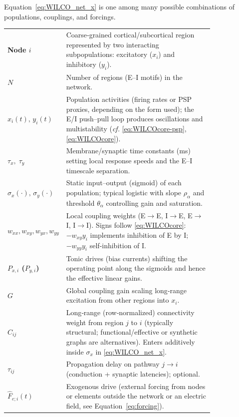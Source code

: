 \documentclass[12pt]{article}
\numberwithin{equation}{section}
\begin{document}
Equation~\ref{eq:WILCO_net_x} is one among many possible combinations of populations, couplings, and forcings.

\begin{tcolorbox}[
  colback=gray!5,
  colframe=slate,
  colbacktitle=softblue!25,
  coltitle=softblue!60!black,
  fonttitle=\bfseries\small,
  title={\small \textit{Wilson-Cowan Network (Eq.~\ref{eq:WILCO_net_x})} \\ Whole-brain Simulations Parameters \& Physiological Meaning},
  boxrule=0.4pt, enhanced, sharp corners,
  left=4pt,right=4pt,top=3pt,bottom=3pt,
  boxsep=2pt, before skip=6pt, after skip=6pt
]
\scriptsize
\begin{tabular}{@{}l p{0.82\linewidth}@{}}
\textbf{Node $i$} & Coarse‑grained cortical/subcortical region represented by two interacting subpopulations: excitatory ($x_i$) and inhibitory ($y_i$).\\
\textbf{$N$} & Number of regions (E–I motifs) in the network.\\
\textbf{$x_i(t),\,y_i(t)$} & Population activities (firing rates or PSP proxies, depending on the form used); the E/I push–pull loop produces oscillations and multistability (\emph{cf.} \eqref{eq:WILCOcore-psp}, \eqref{eq:WILCOcore}).\\
\textbf{$\tau_x,\;\tau_y$} & Membrane/synaptic time constants (ms) setting local response speeds and the E–I timescale separation.\\
\textbf{$\sigma_x(\cdot),\,\sigma_y(\cdot)$} & Static input–output (sigmoid) of each population; typical logistic with slope $\rho_{\alpha}$ and threshold $\theta_{\alpha}$ controlling gain and saturation.\\
\textbf{$w_{xx},w_{xy},w_{yx},w_{yy}$} & Local coupling weights (E$\to$E, I$\to$E, E$\to$I, I$\to$I). Signs follow \eqref{eq:WILCOcore}: $-w_{xy}y_i$ implements inhibition of E by I; $-w_{yy}y_i$ self‑inhibition of I.\\
\textbf{$P_{x,i}$ ($P_{y,i}$)} & Tonic drives (bias currents) shifting the operating point along the sigmoids and hence the effective linear gains.\\
\textbf{$G$} & Global coupling gain scaling long‑range excitation from other regions into $x_i$.\\
\textbf{$C_{ij}$} & Long‑range (row‑normalized) connectivity weight from region $j$ to $i$ (typically structural; functional/effective or synthetic graphs are alternatives). Enters additively inside $\sigma_x$ in \eqref{eq:WILCO_net_x}.\\
\textbf{$\tau_{ij}$} & Propagation delay on pathway $j{\to}i$ (conduction + synaptic latencies); optional.\\
\textbf{$\hat F_{e;i}(t)$}& Exogenous drive  (external forcing from nodes or elements outside the network or an electric field, see Equation~\ref{eq:forcing}). 
\end{tabular}
\end{tcolorbox}
\end{document}
